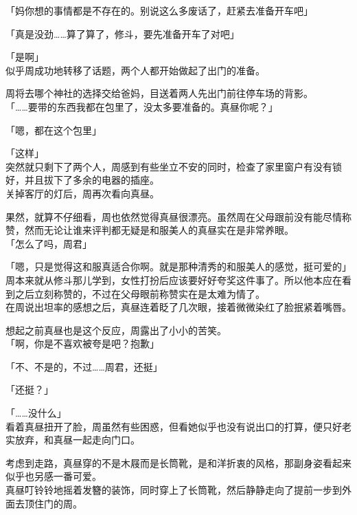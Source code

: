 「妈你想的事情都是不存在的。别说这么多废话了，赶紧去准备开车吧」

「真是没劲……算了算了，修斗，要先准备开车了对吧」

「是啊」\\

似乎周成功地转移了话题，两个人都开始做起了出门的准备。

周将去哪个神社的选择交给爸妈，目送着两人先出门前往停车场的背影。\\

「……要带的东西我都在包里了，没太多要准备的。真昼你呢？」

「嗯，都在这个包里」

「这样」\\

突然就只剩下了两个人，周感到有些坐立不安的同时，检查了家里窗户有没有锁好，并且拔下了多余的电器的插座。\\%

关掉客厅的灯后，周再次看向真昼。

果然，就算不仔细看，周也依然觉得真昼很漂亮。虽然周在父母跟前没有能尽情称赞，然而无论让谁来评判都无疑是和服美人的真昼实在是非常养眼。\\

「怎么了吗，周君」

「嗯，只是觉得这和服真适合你啊。就是那种清秀的和服美人的感觉，挺可爱的」\\

周本来就从修斗那儿学到，女性打扮后应该要好好夸奖这件事了。所以他本应在看到之后立刻称赞的，不过在父母眼前称赞实在是太难为情了。\\

在周说出坦率的感想之后，真昼连着眨了几次眼，接着微微染红了脸抿紧着嘴唇。

想起之前真昼也是这个反应，周露出了小小的苦笑。\\

「啊，你是不喜欢被夸是吧？抱歉」

「不、不是的，不过……周君，还挺」

「还挺？」

「……没什么」\\

看着真昼扭开了脸，周虽然有些困惑，但看她似乎也没有说出口的打算，便只好老实放弃，和真昼一起走向门口。

考虑到走路，真昼穿的不是木屐而是长筒靴，是和洋折衷的风格，那副身姿看起来似乎也另感一番可爱。\\

真昼叮铃铃地摇着发簪的装饰，同时穿上了长筒靴，然后静静走向了提前一步到外面去顶住门的周。

